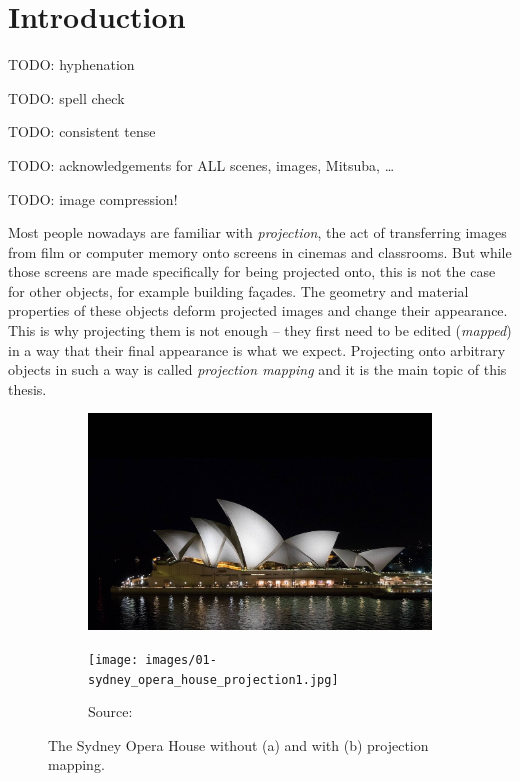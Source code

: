 \chapter{Introduction}
\label{chapter:intro}

{\color{red} TODO: hyphenation}

{\color{red} TODO: spell check}

{\color{red} TODO: consistent tense}

{\color{red} TODO: acknowledgements for ALL scenes, images, Mitsuba, \dots}

{\color{red} TODO: image compression!}

Most people nowadays are familiar with \textit{projection}, the act of transferring images from film or computer memory onto screens in cinemas and classrooms. But while those screens are made specifically for being projected onto, this is not the case for other objects, for example building façades. The geometry and material properties of these objects deform projected images and change their appearance. This is why projecting them is not enough -- they first need to be edited (\textit{mapped}) in a way that their final appearance is what we expect. Projecting onto arbitrary objects in such a way is called \textit{projection mapping} and it is the main topic of this thesis.

\begin{figure}[ht]
    \centering
    \begin{subfigure}[b]{0.49\textwidth}
        \centering
        \includegraphics[width=\textwidth]{images/01-sydney_opera_house_night-edit.jpg}
        \caption{}
    \end{subfigure}
    \hfill
    \begin{subfigure}[b]{0.49\textwidth}
        \centering
        \texttt{[image: images/01-sydney\_opera\_house\_projection1.jpg]}
        \caption{Source: \citet{ImageProjectionMappingExampleSydney}}
    \end{subfigure}
    \caption{The Sydney Opera House without (a) and with (b) projection mapping.}
    \label{fig:intro_example_sydney}
\end{figure}

